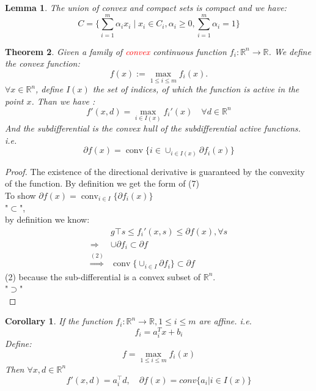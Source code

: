 \documentclass[a4paper,11pt,fleqn, draft]{book}
\newtheorem{theorem}{Theorem}[section]
\newtheorem{corollary}{Corollary}[theorem]
\newtheorem{lemma}[theorem]{Lemma}
\theoremstyle{definition}
\theoremstyle{remark}
\DeclareMathOperator*{\conv}{conv}
\begin{document}
\begin{lemma}
	The union of convex and compact sets is compact and we have:
	\begin{equation*}
		C = \{ \sum_{i = 1}^m \alpha_i x_i \mid x_i \in C_i, \alpha_i \geq 0, \sum_{i = 1}^m \alpha_i = 1\}
	\end{equation*}
\end{lemma}

\begin{theorem}
Given a family of \textcolor{red}{convex} continuous function $f_i: \mathbb{R}^n \longrightarrow \mathbb{R}$. We define the convex function:
\begin{equation}
	f(x) := \max_{1\leq i \leq m} f_i(x).
\end{equation}
$\forall x \in \mathbb{R}^n$, define $I(x)$ the set of indices, of which the function is active in the point $x$. Than we have :
\begin{equation*}
	f'(x, d) = \max_{i \in I(x)} f_i'(x) \quad \forall d \in \mathbb{R}^n
\end{equation*}
And the subdifferential is the convex hull of the subdifferential active functions. i.e.
\begin{equation*}
	\partial f(x) = \conv \{ i \in \cup_{i \in I(x)} \partial f_i(x)\}
\end{equation*}
\end{theorem}

\begin{proof}
The existence of the directional derivative is guaranteed by the convexity of the function. By definition we get the form of (7)\\
To show $\partial f(x) = \conv_{i \in I} \{ \partial f_i(x) \}$\\
"$\subset$", \\
by definition we know:
\begin{align*}
	&g\top s \leq f_i'(x, s) \leq \partial f(x), \forall s\\
	\Rightarrow & \cup \partial f_i \subset \partial f\\
	\overset{(2)}{\Rightarrow} & \conv\{\cup_{i \in I} \partial f_i \} \subset \partial f
\end{align*}
(2) because the sub-differential is a convex subset of $\mathbb{R}^n$.\\
"$\supset$"\\
\end{proof}

\begin{corollary}
If the function $f_i:\mathbb{R}^n \longrightarrow \mathbb{R}, 1 \leq i \leq m$ are affine. i.e.
\begin{equation*}
	f_i = a_i^T x + b_i
\end{equation*}
Define:
\begin{equation*}
	f = \max_{1 \leq i \leq m} f_i(x)
\end{equation*}
Then $\forall x, d \in \mathbb{R}^n$
\begin{equation*}
	f'(x, d) = a_i^\top d, \quad \partial f(x) = conv\{a_i | i \in I(x)\}
\end{equation*}
\end{corollary}
\end{document}
